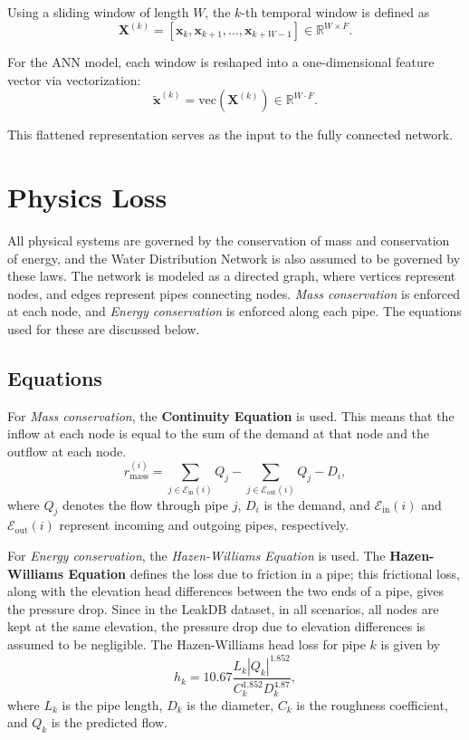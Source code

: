 \documentclass[final,5p,times,twocolumn,authoryear]{elsarticle}
\begin{document}
Using a sliding window of length $W$, the $k$-th temporal window is defined as
\begin{equation}
\mathbf{X}^{(k)} =
\left[
\mathbf{x}_{k},
\mathbf{x}_{k+1},
\dots,
\mathbf{x}_{k+W-1}
\right]
\in \mathbb{R}^{W \times F}.
\end{equation}

For the ANN model, each window is reshaped into a one-dimensional feature vector via vectorization:
\begin{equation}
\tilde{\mathbf{x}}^{(k)} =
\mathrm{vec}\left(\mathbf{X}^{(k)}\right)
\in \mathbb{R}^{W \cdot F}.
\end{equation}

This flattened representation serves as the input to the fully connected network.

\section{Physics Loss}
All physical systems are governed by the conservation of mass and conservation of energy, and the Water Distribution Network is also assumed to be governed by these laws. The network is modeled as a directed graph, where vertices represent nodes, and edges represent pipes connecting nodes. \textit{Mass conservation} is enforced at each node, and \textit{Energy conservation} is enforced along each pipe. The equations used for these are discussed below.

\subsection{Equations}
For \textit{Mass conservation}, the \textbf{Continuity Equation} is used. This means that the inflow at each node is equal to the sum of the demand at that node and the outflow at each node.
\[
r^{(i)}_{\mathrm{mass}}
=
\sum_{j \in \mathcal{E}_{\mathrm{in}}(i)} Q_j
-
\sum_{j \in \mathcal{E}_{\mathrm{out}}(i)} Q_j
-
D_i,
\]
where $Q_j$ denotes the flow through pipe $j$, $D_i$ is the demand, and $\mathcal{E}_{\mathrm{in}}(i)$ and $\mathcal{E}_{\mathrm{out}}(i)$ represent incoming and outgoing pipes, respectively.

\vspace{0.3cm}

For \textit{Energy conservation}, the \textit{Hazen-Williams Equation} is used. The \textbf{Hazen-Williams Equation} defines the loss due to friction in a pipe; this frictional loss, along with the elevation head differences between the two ends of a pipe, gives the pressure drop. Since in the LeakDB dataset, in all scenarios, all nodes are kept at the same elevation, the pressure drop due to elevation differences is assumed to be negligible. The Hazen-Williams head loss for pipe $k$ is given by
\[
h_k
=
10.67 \frac{L_k |Q_k|^{1.852}}{C_k^{1.852} D_k^{4.87}},
\]
where $L_k$ is the pipe length, $D_k$ is the diameter, $C_k$ is the roughness coefficient, and $Q_k$ is the predicted flow.
\end{document}
